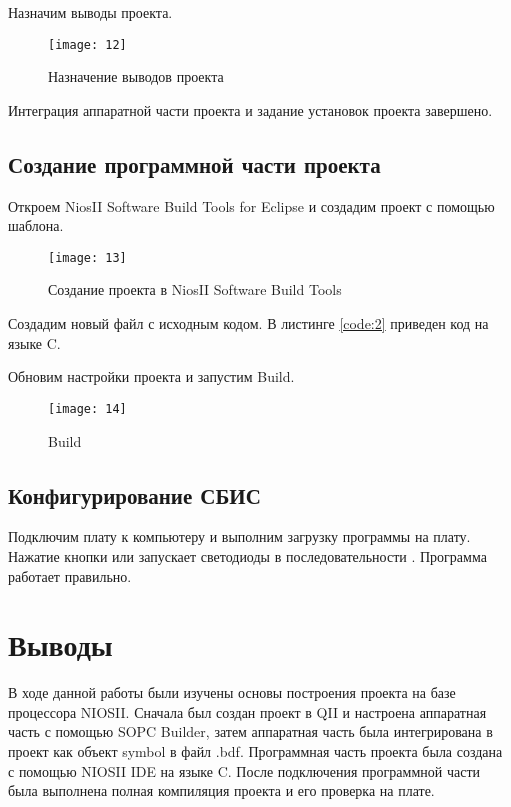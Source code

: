 Назначим выводы проекта.
\begin{figure}[H]
	\centering
	\texttt{[image: 12]}
	\caption{Назначение выводов проекта}
\end{figure}

Интеграция аппаратной части проекта и задание установок проекта завершено.

\subsection{Создание программной части проекта}

Откроем NiosII Software Build Tools for Eclipse и создадим проект с помощью шаблона.
\begin{figure}[H]
	\centering
	\texttt{[image: 13]}
	\caption{Создание проекта в NiosII Software Build Tools}
\end{figure}

Создадим новый файл с исходным кодом. В листинге \ref{code:2} приведен код на языке C.


Обновим настройки проекта и запустим Build.
\begin{figure}[H]
	\centering
	\texttt{[image: 14]}
	\caption{Build}
\end{figure}

\subsection{Конфигурирование СБИС}

Подключим плату к компьютеру и выполним загрузку программы на плату. Нажатие кнопки  или  запускает светодиоды в последовательности . Программа работает правильно.

\section{Выводы}

В ходе данной работы были изучены основы построения проекта на базе процессора NIOSII. Сначала был создан проект в QII и настроена аппаратная часть с помощью SOPC Builder, затем аппаратная часть была интегрирована в проект как объект symbol в файл .bdf. Программная часть проекта была создана с помощью NIOSII IDE на языке C. После подключения программной части была выполнена полная компиляция проекта и его проверка на плате. 

